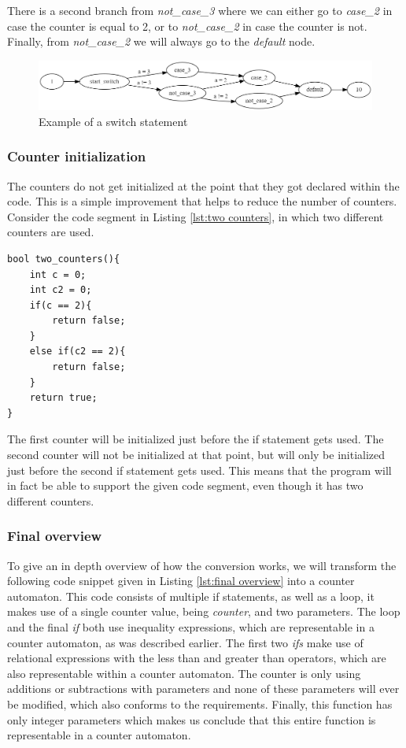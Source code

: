 \documentclass[12pt]{article}
\begin{document}
There is a second branch from \textit{not\_case\_3} where we can either go to \textit{case\_2} in case the counter is equal to 2, or to \textit{not\_case\_2} in case the counter is not. Finally, from \textit{not\_case\_2} we will always go to the \textit{default} node.

\begin{figure}[h]
	\centering
	\includegraphics[width=\linewidth]{counter_switch}
	\caption{Example of a switch statement}
	\label{fig:counter_switch}
\end{figure}

\subsubsection{Counter initialization}
The counters do not get initialized at the point that they got declared within the code. This is a simple improvement that helps to reduce the number of counters. Consider the code segment in Listing \ref{lst:two counters}, in which two different counters are used.

\begin{lstlisting}[style=CStyle, caption={Example of a function with two non-overlapping counters}, label={lst:two counters}]
bool two_counters(){
	int c = 0;
	int c2 = 0;
	if(c == 2){
		return false;
	}
	else if(c2 == 2){
		return false;
	}
	return true;
}
\end{lstlisting}
The first counter will be initialized just before the if statement gets used. The second counter will not be initialized at that point, but will only be initialized just before the second if statement gets used. This means that the program will in fact be able to support the given code segment, even though it has two different counters.

\subsubsection{Final overview}
To give an in depth overview of how the conversion works, we will transform the following code snippet given in Listing \ref{lst:final overview} into a counter automaton. This code consists of multiple if statements, as well as a loop, it makes use of a single counter value, being \textit{counter}, and two parameters. The loop and the final \textit{if} both use inequality expressions, which are representable in a counter automaton, as was described earlier. The first two \textit{ifs} make use of relational expressions with the less than and greater than operators, which are also representable within a counter automaton. The counter is only  using additions or subtractions with parameters and none of these parameters will ever be modified, which also conforms to the requirements. Finally, this function has only integer parameters which makes us conclude that this entire function is representable in a counter automaton.
\newpage
\end{document}
